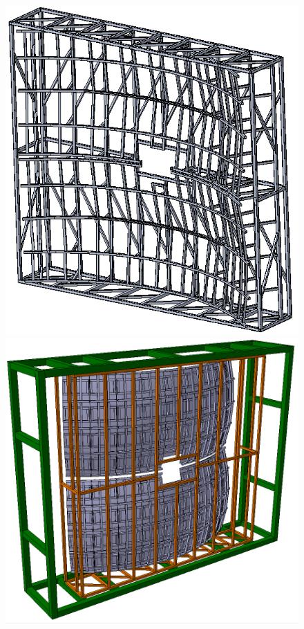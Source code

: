 
\begin{figure}[H]
\begin{minipage}[b]{0.495\textwidth}
\includegraphics[width=1.0\textwidth]{pictures/Frame_small_CAD.png}
\end{minipage}
\hspace{0.01\textwidth}
\begin{minipage}[b]{0.495\textwidth}
\includegraphics[width=1.0\textwidth]{pictures/Frame_small_MC2.png}

\end{minipage}
\end{figure}
